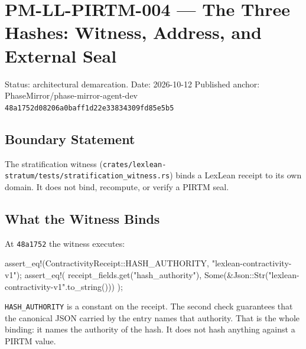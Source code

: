 \documentclass[
]{article}
\author{}
\date{}
\newenvironment{Shaded}{}{}
\newcommand{\BuiltInTok}[1]{\textcolor[rgb]{0.00,0.50,0.00}{#1}}
\newcommand{\ConstantTok}[1]{\textcolor[rgb]{0.53,0.00,0.00}{#1}}
\newcommand{\NormalTok}[1]{#1}
\newcommand{\OperatorTok}[1]{\textcolor[rgb]{0.40,0.40,0.40}{#1}}
\newcommand{\PreprocessorTok}[1]{\textcolor[rgb]{0.74,0.48,0.00}{#1}}
\newcommand{\StringTok}[1]{\textcolor[rgb]{0.25,0.44,0.63}{#1}}
\begin{document}
\hypertarget{pm-ll-pirtm-004-the-three-hashes-witness-address-and-external-seal}{%
\section{PM-LL-PIRTM-004 --- The Three Hashes: Witness, Address, and
External
Seal}\label{pm-ll-pirtm-004-the-three-hashes-witness-address-and-external-seal}}

Status: architectural demarcation. Date: 2026-10-12 Published anchor:
PhaseMirror/phase-mirror-agent-dev
\texttt{48a1752d08206a0baff1d22e33834309fd85e5b5}

\hypertarget{boundary-statement}{%
\subsection{Boundary Statement}\label{boundary-statement}}

The stratification witness
(\texttt{crates/lexlean-stratum/tests/stratification\_witness.rs}) binds
a LexLean receipt to its own domain. It does not bind, recompute, or
verify a PIRTM seal.

\hypertarget{what-the-witness-binds}{%
\subsection{What the Witness Binds}\label{what-the-witness-binds}}

At \texttt{48a1752} the witness executes:

\begin{Shaded}
\begin{Highlighting}[]
\PreprocessorTok{assert\_eq!}\NormalTok{(}\PreprocessorTok{ContractivityReceipt::}\NormalTok{HASH\_AUTHORITY}\OperatorTok{,} \StringTok{"lexlean{-}contractivity{-}v1"}\NormalTok{)}\OperatorTok{;}
\PreprocessorTok{assert\_eq!}\NormalTok{(}
\NormalTok{    receipt\_fields}\OperatorTok{.}\NormalTok{get(}\StringTok{"hash\_authority"}\NormalTok{)}\OperatorTok{,}
    \ConstantTok{Some}\NormalTok{(}\OperatorTok{\&}\PreprocessorTok{Json::}\BuiltInTok{Str}\NormalTok{(}\StringTok{"lexlean{-}contractivity{-}v1"}\OperatorTok{.}\NormalTok{to\_string()))}
\NormalTok{)}\OperatorTok{;}
\end{Highlighting}
\end{Shaded}

\texttt{HASH\_AUTHORITY} is a constant on the receipt. The second check
guarantees that the canonical JSON carried by the entry names that
authority. That is the whole binding: it names the authority of the
hash. It does not hash anything against a PIRTM value.
\end{document}
